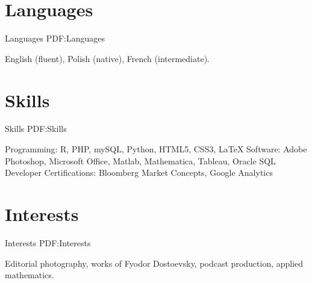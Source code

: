 \documentclass[letterpaper,10pt,oneside]{article}
\begin{document}
\begin{body}

\noindent\hrulefill
\section
{Languages}
{Languages}
{PDF:Languages}

English (fluent), Polish (native), French (intermediate).


\section
{Skills}
{Skills}
{PDF:Skills}

Programming: R, PHP, mySQL, Python, HTML5, CSS3, \LaTeX \hfill\break
Software: Adobe Photoshop, Microsoft Office, Matlab, Mathematica, Tableau, Oracle SQL Developer\hfill\break
Certifications: Bloomberg Market Concepts, Google Analytics


\section
{Interests}
{Interests}
{PDF:Interests}

Editorial photography, works of Fyodor Dostoevsky, podcast production, applied mathematics.


\begin{comment}
\section
{References}
{References}
{PDF:References}

Available upon request.
\end{comment}


\begin{comment}

\section
{Section\newline
With\newline
Usage\newline
Examples}
{Section With Usage Examples (For PDF Bookmark)}
{PDF:SectionWithUsageExamples:ForPDFLink}


\end{comment}
\end{body}
\end{document}
